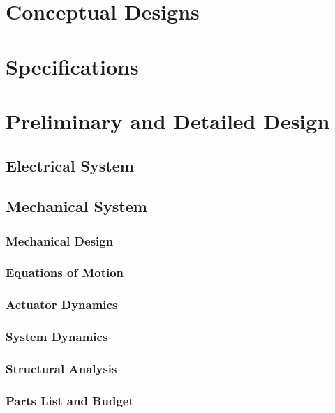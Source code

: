 

\normalem


\section{Conceptual Designs}


\newpage
\section{Specifications}

\newpage
\section{Preliminary and Detailed Design}
\subsection{Electrical System}

\subsection{Mechanical System}

\subsubsection{Mechanical Design}

\subsubsection{Equations of Motion}

\subsubsection{Actuator Dynamics}

\subsubsection{System Dynamics}

\newpage
\subsubsection{Structural Analysis}

\newpage
\subsubsection{Parts List and Budget}

% 
